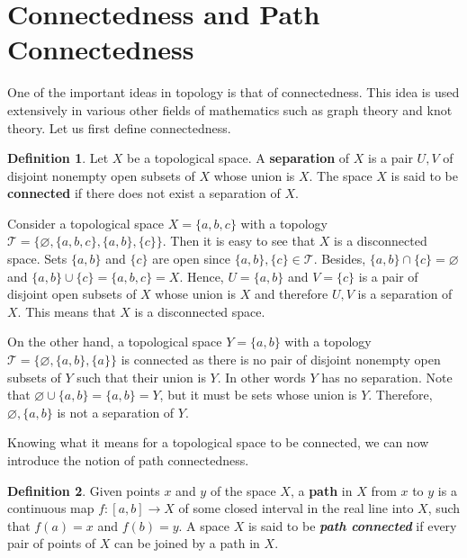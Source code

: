\documentclass[12pt]{article}
\newcommand{\topology}{\mathcal{T}}              %
\renewcommand{\emptyset}{\varnothing}            %
\newcommand\und[1]{\underline{\smash{#1}}}       %
\theoremstyle{definition}
\newtheorem*{definition}{Definition}
\begin{document}
\section*{\centering Connectedness and Path Connectedness}
One of the important ideas in topology is that of connectedness.
This idea is used extensively in various other fields of mathematics such as graph theory and knot theory.
Let us first define connectedness.

\begin{definition}
\cite{8} Let $X$ be a topological space. A \textbf{separation} of $X$ is a pair $U, V$ of disjoint
nonempty open subsets of $X$ whose union is $X$. The space $X$ is said to be \textbf{connected}
if there does not exist a separation of $X$.
\end{definition}

Consider a topological space $X = \{a, b, c\}$ with a topology $\topology = \{\emptyset, \{a, b, c\}, \{a, b\}, \{c\}\}$.
Then it is easy to see that $X$ is a disconnected space. Sets $\{a, b\}$ and $\{c\}$ are open since $\{a, b\}, \{c\} \in \topology$.
Besides, $\{a, b\} \cap \{c\} = \emptyset$ and $\{a, b\} \cup \{c\} = \{a, b, c\} = X$.
Hence, $U = \{a, b\}$ and $V = \{c\}$ is a pair of disjoint open subsets of $X$ whose union is $X$
and therefore $U, V$ is a separation of $X$. This means that $X$ is a disconnected space.

\bigskip

On the other hand, a topological space $Y = \{a, b\}$ with a topology $\topology = \{\emptyset, \{a, b\}, \{a\}\}$
is connected as there is no pair of disjoint nonempty open subsets of $Y$ such that their union is $Y$.
In other words $Y$ has no separation. Note that $\emptyset \cup \{a, b\} = \{a, b\} = Y$, but it must be \und{nonempty}
sets whose union is $Y$. Therefore, $\emptyset, \{a, b\}$ is not a separation of $Y$.

\bigskip

Knowing what it means for a topological space to be connected, we can now introduce the notion
of path connectedness.

\begin{definition}
\cite{9} Given points $x$ and $y$ of the space $X$, a \textbf{path} in $X$ from $x$ to $y$ is a 
continuous map $f : [a, b] \to X$ of some closed interval in the real line into $X$, such
that $f(a) = x$ and $f(b) = y$. A space $X$ is said to be \textit{\textbf{path connected}} if every pair of
points of $X$ can be joined by a path in $X$.
\end{definition}
\end{document}
